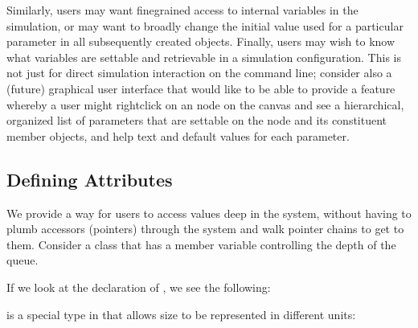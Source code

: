 \documentclass[letterpaper,10pt,english]{sphinxmanual}
\renewcommand{\sphinxcode}[1]{\texttt{\small{#1}}}
\begin{document}
Similarly, users may want fine\sphinxhyphen{}grained access to internal variables in the
simulation, or may want to broadly change the initial value used for a
particular parameter in all subsequently created objects. Finally, users may
wish to know what variables are settable and retrievable in a simulation
configuration. This is not just for direct simulation interaction on the command
line; consider also a (future) graphical user interface that would like to be
able to provide a feature whereby a user might right\sphinxhyphen{}click on an node on the
canvas and see a hierarchical, organized list of parameters that are settable on
the node and its constituent member objects, and help text and default values
for each parameter.


\subsection{Defining Attributes}
\label{\detokenize{attributes:defining-attributes}}
We provide a way for users to access values deep in the system, without having
to plumb accessors (pointers) through the system and walk pointer chains to get
to them. Consider a class \sphinxcode{} that has a member variable
\sphinxcode{} controlling the depth of the queue.

If we look at the declaration of \sphinxcode{}, we see
the following:

\begin{sphinxVerbatim}[commandchars=\\\{\}]
     
     

                   
\end{sphinxVerbatim}

\sphinxcode{} is a special type in  that allows size
to be represented in different units:
\end{document}
